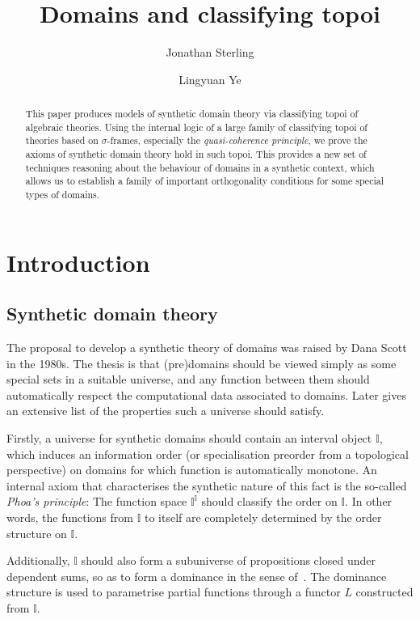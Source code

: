 \documentclass[a4paper,12pt]{amsart}
\title{Domains and classifying topoi}
\author{Jonathan Sterling}
\author{Lingyuan Ye}
\theoremstyle{definition}
\newcommand{\mbb}[1]{\mathbb{#1}}
\newcommand{\I}{\mbb I}
\begin{document}
\begin{abstract}
  This paper produces models of synthetic domain theory via classifying topoi of algebraic theories. Using the internal logic of a large family of classifying topoi of theories based on $\sigma$-frames, especially the \emph{quasi-coherence principle}, we prove the axioms of synthetic domain theory hold in such topoi. This provides a new set of techniques reasoning about the behaviour of domains in a synthetic context, which allows us to establish a family of important orthogonality conditions for some special types of domains.
\end{abstract}

\maketitle


\section{Introduction}\label{sec:intro}

\subsection{Synthetic domain theory}\label{subsec:sdt}

The proposal to develop a synthetic theory of domains was raised by Dana Scott in the 1980s. The thesis is that (pre)domains should be viewed simply as some special sets in a suitable universe, and any function between them should automatically respect the computational data associated to domains. Later \citet{hyland1990first} gives an extensive list of the properties such a universe should satisfy.

Firstly, a universe for synthetic domains should contain an interval object $\I$, which induces an information order (or specialisation preorder from a topological perspective) on domains for which function is automatically monotone. An internal axiom that characterises the synthetic nature of this fact is the so-called \emph{Phoa's principle}: The function space $\I^\I$ should classify the order on $\I$. In other words, the functions from $\I$ to itself are completely determined by the order structure on $\I$. 

Additionally, $\I$ should also form a subuniverse of propositions closed under dependent sums, so as to form a dominance in the sense of~\cite{rosolini1986continuity}. The dominance structure is used to parametrise partial functions through a functor $L$ constructed from $\I$. 
\end{document}
